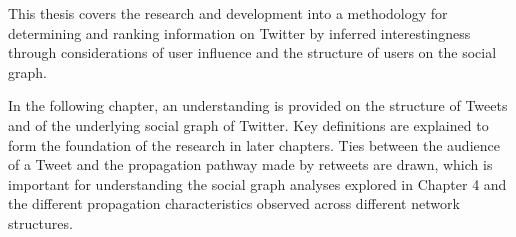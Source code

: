 This thesis covers the research and development into a methodology for determining and ranking information on Twitter by inferred interestingness through considerations of user influence and the structure of users on the social graph.

In the following chapter, an understanding is provided on the structure of Tweets and of the underlying social graph of Twitter. Key definitions are explained to form the foundation of the research in later chapters. Ties between the audience of a Tweet and the propagation pathway made by retweets are drawn, which is important for understanding the social graph analyses explored in Chapter 4 and the different propagation characteristics observed across different network structures.
